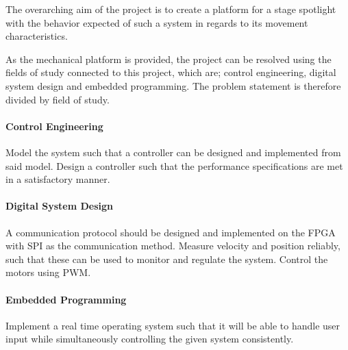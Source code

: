 \documentclass[../../main]{subfiles}
\begin{document}
The overarching aim of the project is to create a platform for a stage spotlight with the behavior expected of such a system in regards to its movement characteristics.

As the mechanical platform is provided, the project can be resolved using the fields of study connected to this project, which are; control engineering, digital system design and embedded programming.
The problem statement is therefore divided by field of study.




\paragraph{Control Engineering}%
\label{par:control_engineering}
Model the system such that a controller can be designed and implemented from said model.
Design a controller such that the performance specifications are met in a satisfactory manner.

\paragraph{Digital System Design}%
\label{par:digital_system_design}
A communication protocol should be designed and implemented on the FPGA with SPI as the communication method. 
Measure velocity and position reliably, such that these can be used to monitor and regulate the
system.
Control the motors using PWM.

\paragraph{Embedded Programming}%
\label{par:emebedded_programming}
Implement a real time operating system such that it will be able to handle user input while simultaneously controlling the given system consistently.
\\
\end{document}

